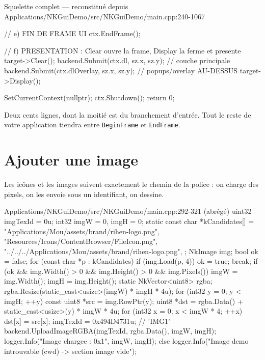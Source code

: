 \begin{nkcode}{Squelette complet — reconstitué depuis Applications/NKGuiDemo/src/NKGuiDemo/main.cpp:240-1067}
{{        // e) FIN DE FRAME UI
        ctx.EndFrame();

        // f) PRESENTATION : Clear ouvre la frame, Display la ferme et presente
        target->Clear();
        backend.Submit(ctx.dl,        sz.x, sz.y);        // couche principale
        backend.Submit(ctx.dlOverlay, sz.x, sz.y);        // popups/overlay AU-DESSUS
        target->Display();
    }

    SetCurrentContext(nullptr);
    ctx.Shutdown();
    return 0;
}
\end{nkcode}

\begin{nkretenir}
Deux cents lignes, dont la moitié est du branchement d'entrée. Tout le reste de
votre application tiendra entre \texttt{BeginFrame} et \texttt{EndFrame}.
\end{nkretenir}

\section{Ajouter une image}

Les icônes et les images suivent exactement le chemin de la police : on charge
des pixels, on les envoie sous un identifiant, on dessine.

\begin{nkcode}{Applications/NKGuiDemo/src/NKGuiDemo/main.cpp:292-321 (abrégé)}
    uint32 imgTexId = 0u;
    int32 imgW = 0, imgH = 0;
    {
        static const char *kCandidates[] = {
            "Applications/Mou/assets/brand/rihen-logo.png",
            "Resources/Icons/ContentBrowser/FileIcon.png",
            "../../../Applications/Mou/assets/brand/rihen-logo.png",
        };
        NkImage img;
        bool ok = false;
        for (const char *p : kCandidates)
            if (img.Load(p, 4)) { ok = true; break; }
        if (ok && img.Width() > 0 && img.Height() > 0 && img.Pixels()) {
            imgW = img.Width();
            imgH = img.Height();
            static NkVector<uint8> rgba;
            rgba.Resize(static_cast<usize>(imgW) * imgH * 4u);
            for (int32 y = 0; y < imgH; ++y) {
                const uint8 *src = img.RowPtr(y);
                uint8 *dst = rgba.Data() + static_cast<usize>(y) * imgW * 4u;
                for (int32 x = 0; x < imgW * 4; ++x)
                    dst[x] = src[x];
            }
            imgTexId = 0x494D4731u; // 'IMG1'
            backend.UploadImageRGBA(imgTexId, rgba.Data(), imgW, imgH);
            logger.Info("Image chargee : {0}x{1}", imgW, imgH);
        } else {
            logger.Info("Image demo introuvable (cwd) -> section image vide");
        }
    }
\end{nkcode}

